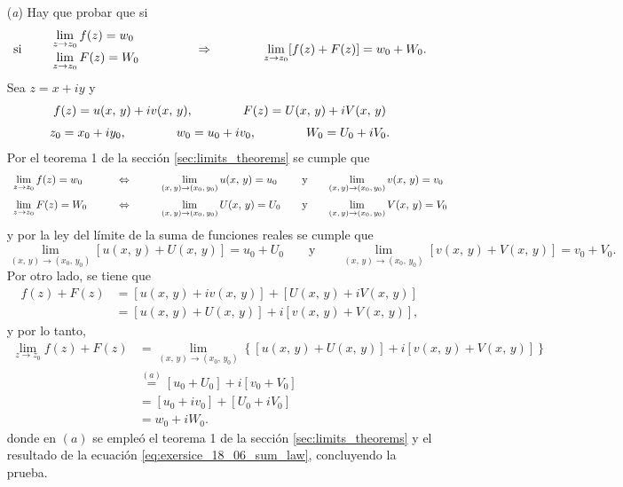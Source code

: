 \documentclass[a4paper]{report}
\begin{document}
\begin{enumerate}
 \item[(\textit{a})] Hay que probar que si
 \[
  \textrm{si}\qquad
  \begin{array}{l}
   \displaystyle\lim_{z\to z_0}f(z)=w_0\\[\medskipamount]
   \displaystyle\lim_{z\to z_0}F(z)=W_0
  \end{array}
  \qquad\qquad\Rightarrow\qquad\qquad 
  \lim_{z\to z_0}[f(z)+F(z)]=w_0+W_0.
 \]
 Sea \(z=x+iy\) y
 \[
 \begin{array}{c}
  f(z)=u(x,\,y)+iv(x,\,y),\qquad\qquad F(z)=U(x,\,y)+iV(x,\,y)\\[\medskipamount]
  z_0=x_0+iy_0,\qquad\qquad w_0=u_0+iv_0,\qquad\qquad W_0=U_0+iV_0.
 \end{array}
 \]
 Por el teorema 1 de la sección \ref{sec:limits_theorems} se cumple que 
 \[
  \begin{array}{lllll}
   \lim\limits_{z\to z_0}f(z)=w_0 & \qquad\Leftrightarrow & \qquad\lim\limits_{(x,\,y)\to(x_0,\,y_0)}u(x,\,y)=u_0 & \quad\textrm{y} &
  \quad\lim\limits_{(x,\,y)\to(x_0,\,y_0)}v(x,\,y)=v_0\\[\bigskipamount]
  \lim\limits_{z\to z_0}F(z)=W_0 & \qquad\Leftrightarrow & \qquad\lim\limits_{(x,\,y)\to(x_0,\,y_0)}U(x,\,y)=U_0 & \quad\textrm{y} &
  \quad\lim\limits_{(x,\,y)\to(x_0,\,y_0)}V(x,\,y)=V_0
  \end{array}
 \]
 y por la ley del límite de la suma de funciones reales se cumple que 
 \begin{equation}\label{eq:exersice_18_06_sum_law}
  \lim_{(x,\,y)\to(x_0,\,y_0)}[u(x,\,y)+U(x,\,y)]=u_0+U_0
  \qquad\textrm{y}\qquad
  \lim_{(x,\,y)\to(x_0,\,y_0)}[v(x,\,y)+V(x,\,y)]=v_0+V_0.
 \end{equation}
 Por otro lado, se tiene que 
 \begin{align*}
  f(z)+F(z)&=[u(x,\,y)+iv(x,\,y)]+[U(x,\,y)+iV(x,\,y)]\\
    &=[u(x,\,y)+U(x,\,y)]+i[v(x,\,y)+V(x,\,y)],
 \end{align*}
y por lo tanto,
\begin{align*}
 \lim_{z\to z_0}f(z)+F(z)&=\lim_{(x,\,y)\to(x_0,\,y_0)}\left\{[u(x,\,y)+U(x,\,y)]+i[v(x,\,y)+V(x,\,y)]\right\}\\
  &\overset{(a)}{=}[u_0+U_0]+i[v_0+V_0]\\
  &=[u_0+iv_0]+[U_0+iV_0]\\
  &=w_0+iW_0.
\end{align*}
donde en \((a)\) se empleó el teorema 1 de la sección \ref{sec:limits_theorems} y el resultado de la ecuación \ref{eq:exersice_18_06_sum_law}, concluyendo la prueba. 

\end{enumerate}
\end{document}
